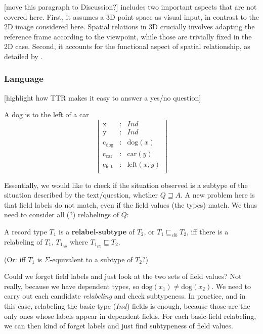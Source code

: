 \documentclass[11pt, a4paper]{article}
\begin{document}
[move this paragraph to Discussion?]
\cite{ttrspat} includes two important aspects that are not covered here.
First, it assumes a 3D point space as visual input, in contrast to the 2D image considered here.
Spatial relations in 3D crucially involves adapting the reference frame according to the viewpoint, while those are trivially fixed in the 2D case.
Second, it accounts for the functional aspect of spatial relationship, as detailed by \cite{CoventryClassificationExtrageometricInfluences2004}.



\subsubsection{Language}

[highlight how TTR makes it easy to answer a yes/no question]

A dog is to the left of a car
\begin{equation}\left[\begin{array}{rcl}
\text{x} &:& Ind\\
\text{y} &:& Ind\\
\text{c}_\text{dog} &:& \text{dog}(x)\\
\text{c}_\text{car} &:& \text{car}(y)\\
\text{c}_\text{left} &:& \text{left}(x, y)\\
\end{array}\right]\end{equation}


Essentially, we would like to check if the situation observed is a subtype of the situation described by the text/question, whether $Q \sqsupseteq A$. A new problem here is that field labels do not match, even if the field values (the types) match. We thus need to consider all (?) relabelings of $Q$:

A record type $T_1$ is a \textbf{relabel-subtype} of $T_2$, or $T_1 \sqsubseteq_{rlb} T_2$,  iff there is a relabeling of $T_1$, $T_{1_{rlb}}$ where $T_{1_{rlb}} \sqsubseteq T_2$.

(Or: iff $T_1$ is $\Sigma$-equivalent to a subtype of $T_2$?)

Could we forget field labels and just look at the two sets of field values? Not really, because we have dependent types, so $\text{dog}(x_1) ≠ \text{dog}(x_2)$. We need to carry out each candidate \textit{relabeling} and check subtypeness. In practice, and in this case, relabeling the basic-type ($Ind$) fields is enough, because those are the only ones whose labels appear in dependent fields. For each basic-field relabeling, we can then kind of forget labels and just find subtypeness of field values.
\end{document}
